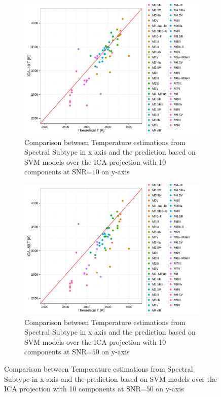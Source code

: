 {\begin {figure}
 \centering
 \begin{subfigure}{.85\textwidth}
  \centering
  \includegraphics[width=12cm]{figs/T_ICA_10_SpT.pdf}
  \caption{Comparison between Temperature estimations from Spectral Subtype 
 in x axis and the prediction based on SVM models over the ICA projection 
 with 10 components at SNR=$10$ on y-axis}
 \label{fig:T_ICA_10_SpT}
 \end{subfigure}
  \begin{subfigure}{.85\textwidth}
   \centering
  \includegraphics[width=12cm]{figs/T_ICA_50_SpT.pdf}
  \caption{Comparison between Temperature estimations from Spectral Subtype 
 in x axis and the prediction based on SVM models over the ICA projection 
 with 10 components at SNR=$50$ on y-axis}
 \label{fig:T_ICA_10_SpT}  
  \end{subfigure}
 \label{fig:t_ica_1050_SpT}
\end {figure}

%
}



